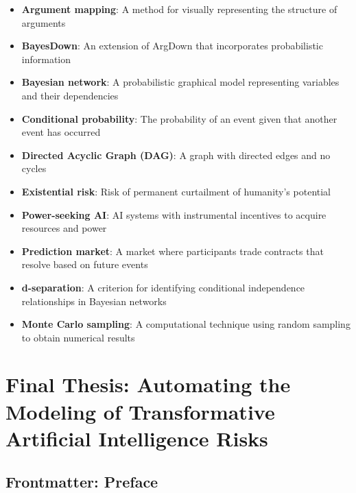 \documentclass[
  11pt,
  letterpaper,
]{book}
\providecommand{\tightlist}{%
  \setlength{\itemsep}{0pt}\setlength{\parskip}{0pt}}
\begin{document}
\begin{itemize}
\tightlist
\item
  \textbf{Argument mapping}: A method for visually representing the
  structure of arguments\\
\item
  \textbf{BayesDown}: An extension of ArgDown that incorporates
  probabilistic information\\
\item
  \textbf{Bayesian network}: A probabilistic graphical model
  representing variables and their dependencies\\
\item
  \textbf{Conditional probability}: The probability of an event given
  that another event has occurred\\
\item
  \textbf{Directed Acyclic Graph (DAG)}: A graph with directed edges and
  no cycles\\
\item
  \textbf{Existential risk}: Risk of permanent curtailment of humanity's
  potential\\
\item
  \textbf{Power-seeking AI}: AI systems with instrumental incentives to
  acquire resources and power\\
\item
  \textbf{Prediction market}: A market where participants trade
  contracts that resolve based on future events\\
\item
  \textbf{d-separation}: A criterion for identifying conditional
  independence relationships in Bayesian networks\\
\item
  \textbf{Monte Carlo sampling}: A computational technique using random
  sampling to obtain numerical results
\end{itemize}


\chapter{Final Thesis: Automating the Modeling of Transformative
Artificial Intelligence
Risks}\label{final-thesis-automating-the-modeling-of-transformative-artificial-intelligence-risks}

\section{Frontmatter: Preface}\label{frontmatter-preface}
\end{document}
